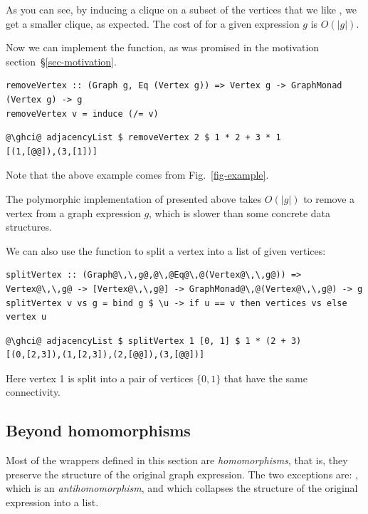 \noindent
As you can see, by inducing a clique on a subset of the vertices
that we like , we get a smaller clique, as expected.
The cost of  for a given expression $g$ is $O(|g|)$.

Now we can implement the  function, as
was promised in the motivation section~\S\ref{sec-motivation}.

\begin{verbatim}
removeVertex :: (Graph g, Eq (Vertex g)) => Vertex g -> GraphMonad (Vertex g) -> g
removeVertex v = induce (/= v)
\end{verbatim}
\vspace{1mm}
\begin{verbatim}
@\ghci@ adjacencyList $ removeVertex 2 $ 1 * 2 + 3 * 1
[(1,[@@]),(3,[1])]
\end{verbatim}

\noindent
Note that the above example comes from Fig.~\ref{fig-example}.

The polymorphic implementation of  presented above takes
$O(|g|)$ to remove a vertex from a graph expression $g$, which is
slower than some concrete data structures.

We can also use the  function to split a vertex into a list of given vertices:

\begin{verbatim}
splitVertex :: (Graph@\,\,g@,@\,@Eq@\,@(Vertex@\,\,g@)) => Vertex@\,\,g@ -> [Vertex@\,\,g@] -> GraphMonad@\,@(Vertex@\,\,g@) -> g
splitVertex v vs g = bind g $ \u -> if u == v then vertices vs else vertex u
\end{verbatim}
\vspace{1mm}
\begin{verbatim}
@\ghci@ adjacencyList $ splitVertex 1 [0, 1] $ 1 * (2 + 3)
[(0,[2,3]),(1,[2,3]),(2,[@@]),(3,[@@])]
\end{verbatim}

\noindent
Here vertex 1 is split into a pair of vertices $\{0, 1\}$ that have the same connectivity.

\subsection{Beyond homomorphisms}\label{sub-beyond}

Most of the  wrappers defined in this section are \emph{homomorphisms},
that is, they preserve the structure of the original graph expression. The two
exceptions are: , which is an \emph{antihomomorphism}, and
 which collapses the structure of the original expression into a list.

